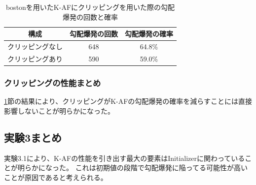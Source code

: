 \begin{table}[htbp]
    \begin{center}
        \caption{bostonを用いたK-AFにクリッピングを用いた際の勾配爆発の回数と確率}
        \label{clipping_boston}
        \vspace{2mm} 
        \begin{tabular}{ |c|c|c| }
        \hline
        構成 & 勾配爆発の回数 & 勾配爆発の確率\\
        \hline
        クリッピングなし  & 648 & 64.8\% \\
        \hline
        クリッピングあり  & 590 & 59.0\% \\
        \hline
        \end{tabular}
    \end{center}
\end{table}



\subsubsection{クリッピングの性能まとめ}
\ref{clipping_boston}節の結果により、クリッピングがK-AFの勾配爆発の確率を減らすことには直接影響しないことが明らかになった。



\subsection{実験3まとめ}
実験3.1により、K-AFの性能を引き出す最大の要素はInitializerに関わっていることが明らかになった。
これは初期値の段階で勾配爆発に陥ってる可能性が高いことが原因であると考えられる。


